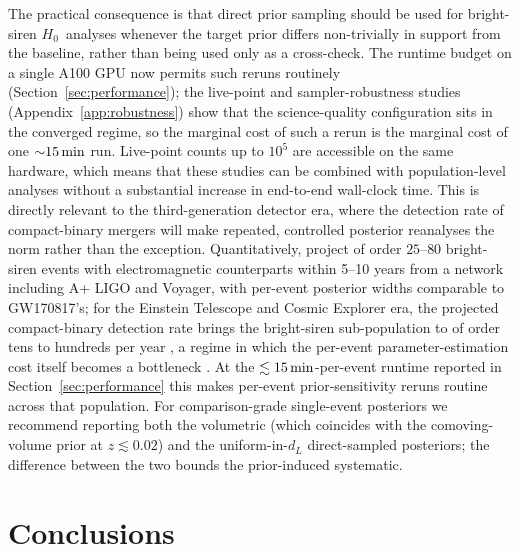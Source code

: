 \documentclass[usenatbib]{mnras}
\newcommand{\hzero}{\ensuremath{H_{0}}\xspace}
\begin{document}
The practical consequence is that direct prior sampling should be used for bright-siren \hzero\ analyses whenever the target prior differs non-trivially in support from the baseline, rather than being used only as a cross-check. The runtime budget on a single A100 GPU now permits such reruns routinely (Section~\ref{sec:performance}); the live-point and sampler-robustness studies (Appendix~\ref{app:robustness}) show that the science-quality configuration sits in the converged regime, so the marginal cost of such a rerun is the marginal cost of one ${\sim}15\,\rm min$ run. Live-point counts up to $10^{5}$ are accessible on the same hardware, which means that these studies can be combined with population-level analyses without a substantial increase in end-to-end wall-clock time. This is directly relevant to the third-generation detector era, where the detection rate of compact-binary mergers will make repeated, controlled posterior reanalyses the norm rather than the exception. Quantitatively, \citet{Chen2018Forecast} project of order $25$--$80$ bright-siren events with electromagnetic counterparts within 5--10 years from a network including A+ LIGO and Voyager, with per-event posterior widths comparable to GW170817's; for the Einstein Telescope and Cosmic Explorer era, the projected compact-binary detection rate brings the bright-siren sub-population to of order tens to hundreds per year \citep[e.g.][]{Branchesi2023ET}, a regime in which the per-event parameter-estimation cost itself becomes a bottleneck \citep{HuVeitch2025}. At the $\lesssim 15\,\rm min$-per-event runtime reported in Section~\ref{sec:performance} this makes per-event prior-sensitivity reruns routine across that population. For comparison-grade single-event posteriors we recommend reporting both the volumetric (which coincides with the comoving-volume prior at $z\lesssim 0.02$) and the uniform-in-$d_L$ direct-sampled posteriors; the difference between the two bounds the prior-induced systematic.

\section{Conclusions}
\label{sec:conclusions}
\end{document}
